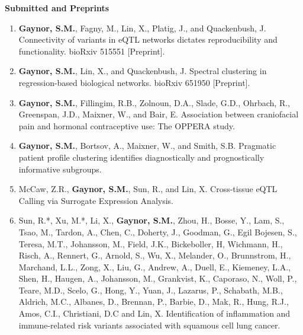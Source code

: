 \documentclass[10pt]{article}
\begin{document}
\vspace{0.2cm}

\indent \textbf{Submitted and Preprints} \\

\begin{enumerate}
\item \textbf{Gaynor, S.M.}, Fagny, M., Lin, X., Platig, J., and Quackenbush, J. Connectivity of variants in eQTL networks dictates reproducibility and functionality. bioRxiv 515551 [Preprint].  
\item \textbf{Gaynor, S.M.}, Lin, X., and Quackenbush, J. Spectral clustering in regression-based biological networks. bioRxiv 651950 [Preprint].
\item \textbf{Gaynor, S.M.}, Fillingim, R.B., Zolnoun, D.A., Slade, G.D., Ohrbach, R., Greenspan, J.D., Maixner, W.,  and Bair, E. Association between craniofacial pain and hormonal contraceptive use: The OPPERA study.
\item \textbf{Gaynor, S.M.}, Bortsov, A., Maixner, W.,  and Smith, S.B. Pragmatic patient profile clustering identifies diagnostically and prognostically informative subgroups.
\item McCaw, Z.R., \textbf{Gaynor, S.M.}, Sun, R.,  and Lin, X. Cross-tissue eQTL Calling via Surrogate Expression Analysis.
\item Sun, R.*, Xu, M.*, Li, X., \textbf{Gaynor, S.M.}, Zhou, H., Bosse, Y., Lam, S., Tsao, M., Tardon, A., Chen, C., Doherty, J., Goodman, G., Egil Bojesen, S., Teresa, M.T., Johansson, M., Field, J.K., Bickeboller, H, Wichmann, H., Risch, A., Rennert, G., Arnold, S., Wu, X., Melander, O., Brunnstrom, H.,
Marchand, L.L., Zong, X., Liu, G., Andrew, A., Duell, E., Kiemeney, L.A., Shen, H., Haugen, A.,
Johansson, M., Grankvist, K., Caporaso, N., Woll, P., Teare, M.D., Scelo, G., Hong, Y., Yuan, J.,
Lazarus, P., Schabath, M.B., Aldrich, M.C., Albanes, D., Brennan, P., Barbie, D., Mak, R., Hung,
R.J., Amos, C.I., Christiani, D.C and Lin, X. Identification of inflammation and immune-related risk variants associated with squamous cell lung cancer.

\end{enumerate}
\end{document}
